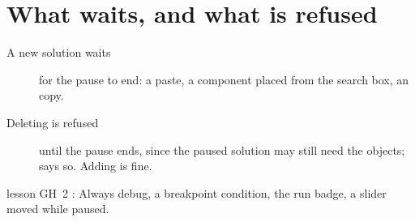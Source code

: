 \section{What waits, and what is refused}

\begin{description}
  \item[A new solution waits] for the pause to end: a paste, a component placed from the search box, an
         copy.
  \item[Deleting is refused] until the pause ends, since the paused solution may still need the objects; 
        says so. Adding is fine.
\end{description}

\begin{lesson}{lesson GH~2}
: Always debug, a breakpoint condition, the run badge, a slider moved while paused.
\end{lesson}
